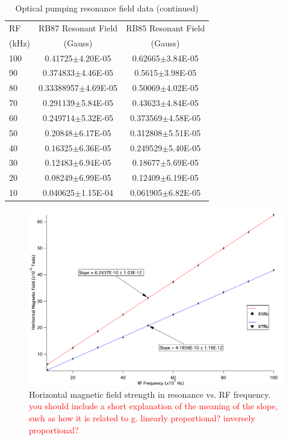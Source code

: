 \documentclass[prb,preprint]{revtex4-1}
\begin{document}
\begin{table}[h]
\centering
\caption{Optical pumping resonance field data (continued)}
\begin{ruledtabular}
\begin{tabular}{ l c c}
RF & RB87 Resonant Field & RB85 Resonant Field\\
(kHz) & (Gauss) & (Gauss)\\
\hline
100 & 0.41725$\pm$4.20E-05 & 0.62665$\pm$3.84E-05\\
90 & 0.374833$\pm$4.46E-05 & 0.5615$\pm$3.98E-05\\
80 & 0.33388957$\pm$4.69E-05 & 0.50069$\pm$4.02E-05\\
70 & 0.291139$\pm$5.84E-05 & 0.43623$\pm$4.84E-05\\
60 & 0.249714$\pm$5.32E-05 & 0.373569$\pm$4.58E-05\\
50 & 0.20848$\pm$6.17E-05 & 0.312808$\pm$5.51E-05\\
40 & 0.16325$\pm$6.36E-05 & 0.249529$\pm$5.40E-05\\
30 & 0.12483$\pm$6.94E-05 & 0.18677$\pm$5.69E-05\\
20 &	0.08249$\pm$6.99E-05 & 0.12409$\pm$6.19E-05\\
10 &	0.040625$\pm$1.15E-04 & 0.061905$\pm$6.82E-05\\

\end{tabular}
\end{ruledtabular}
\label{data2}
\end{table}



\begin{figure}[h]
\centering
\includegraphics[width=16cm]{both.png}
\caption{Horizontal magnetic field strength in resonance vs. RF frequency. \textcolor{red}{you should include a short explanation of the meaning of the slope, such as how it is related to g. linearly proportional? inversely proportional?} }
\label{both}
\end{figure}
\end{document}

